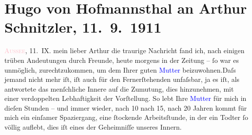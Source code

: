 

               \section[Hugo von Hofmannsthal an Arthur Schnitzler, 11. 9. 1911]{ Hugo von Hofmannsthal an Arthur Schnitzler, 11. 9. 1911}\nopagebreak{}\rehead{ }\normalsize\beginnumbering{} \toendnotes[C]{\smallbreak\pagebreak[2]} 
\toendnotes[C]{\smallbreak}\pstart
           \raggedleft{}{\pb}\textcolor{pink}{\textsc{Aussee}}{}\ledrightnote{\textcolor{pink}{Bad Aussee}}, 11. IX.\pend
           \pstart{}mein lieber Arthur \pend\pstart
           die traurige Nachricht fand ich, nach einigen trüben Andeutungen durch Freunde, heute
               morgens in der Zeitung – ſo war es unmöglich, zurechtzukommen, um dem \label{K_L02027_1v}\label{K_L02027_1h} Ihrer guten \textcolor{blue}{Mutter}{} beizuwohnen.\hspace*{1.5em}Daſs jemand nicht mehr iſt, iſt auch für den Fernerſtehenden
               unfaſsbar, ja es iſt, als antwortete das menſchliche Innere {\pb}auf die Zumutung, dies
               hinzunehmen, mit einer verdoppelten Lebhaftigkeit der Vorſtellung. So lebt Ihre \textcolor{blue}{Mutter}{} für mich in dieſen
               Stunden – und immer wieder, nach 10 nach 15, nach 20 Jahren kommt für mich ein
               einſamer Spaziergang, eine ſtockende Arbeitsſtunde, in der ein Todter ſo völlig
               auflebt, dies iſt eines der Geheimniſſe unseres Innern.\pend
